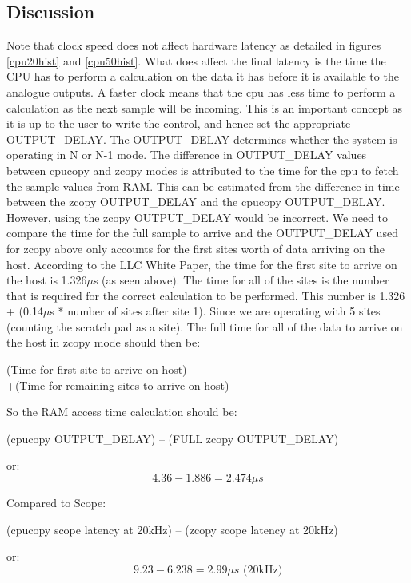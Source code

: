 \documentclass{article}
\begin{document}
\subsection{Discussion}
Note that clock speed does not affect hardware latency as detailed in figures \ref{cpu20hist} and \ref{cpu50hist}.
What does affect the final latency is the time the CPU has to perform a calculation on the data it has before it is available to the analogue outputs.
A faster clock means that the cpu has less time to perform a calculation as the next sample will be incoming.
This is an important concept as it is up to the user to write the control, and hence set the appropriate OUTPUT\_DELAY.
The OUTPUT\_DELAY determines whether the system is operating in N or N-1 mode.
The difference in OUTPUT\_DELAY values between cpucopy and zcopy modes is attributed to the time for the cpu to fetch the sample values from RAM.
This can be estimated from the difference in time between the zcopy OUTPUT\_DELAY and the cpucopy OUTPUT\_DELAY.
However, using the zcopy OUTPUT\_DELAY would be incorrect.
We need to compare the time for the full sample to arrive and the OUTPUT\_DELAY used for zcopy above only accounts for the first sites worth of data arriving on the host.
According to the LLC White Paper, the time for the first site to arrive on the host is 1.326$\mu$s (as seen above).
The time for all of the sites is the number that is required for the correct calculation to be performed.
This number is 1.326 + (0.14$\mu$s * number of sites after site 1). Since we are operating with 5 sites (counting the scratch pad as a site).
The full time for all of the data to arrive on the host in zcopy mode should then be:
\newpage

\begin{center}
	(Time for first site to arrive on host)\\
	+(Time for remaining sites to arrive on host)
\end{center}

So the RAM access time calculation should be:

\begin{center}
	(cpucopy OUTPUT\_DELAY) – (FULL zcopy OUTPUT\_DELAY)
\end{center}
or:
\begin{equation*}
	4.36 - 1.886 = 2.474 \mu s
\end{equation*}

Compared to Scope:

\begin{center}
	(cpucopy scope latency at 20kHz) – (zcopy scope latency at 20kHz)
\end{center}
or:
\begin{equation*}
	9.23 - 6.238 = 2.99 \mu s \text{ (20kHz)}
\end{equation*}
\end{document}
